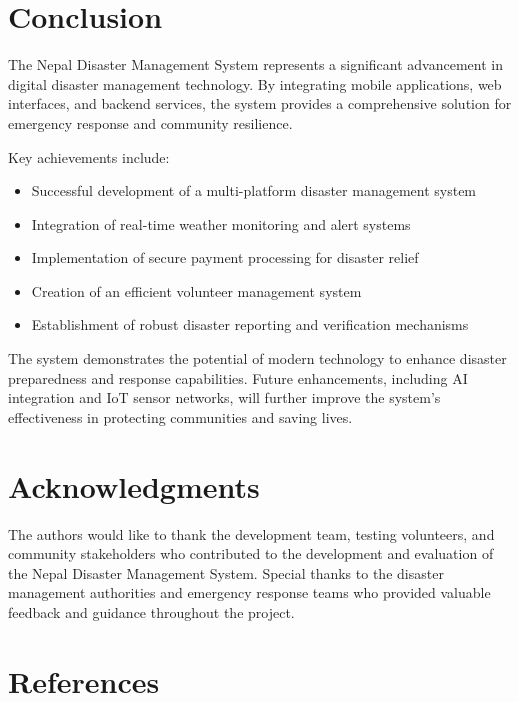 \documentclass[12pt,a4paper]{article}
\begin{document}
\section{Conclusion}

The Nepal Disaster Management System represents a significant advancement in digital disaster management technology. By integrating mobile applications, web interfaces, and backend services, the system provides a comprehensive solution for emergency response and community resilience.

Key achievements include:

\begin{itemize}
    \item Successful development of a multi-platform disaster management system
    \item Integration of real-time weather monitoring and alert systems
    \item Implementation of secure payment processing for disaster relief
    \item Creation of an efficient volunteer management system
    \item Establishment of robust disaster reporting and verification mechanisms
\end{itemize}

The system demonstrates the potential of modern technology to enhance disaster preparedness and response capabilities. Future enhancements, including AI integration and IoT sensor networks, will further improve the system's effectiveness in protecting communities and saving lives.

\section{Acknowledgments}

The authors would like to thank the development team, testing volunteers, and community stakeholders who contributed to the development and evaluation of the Nepal Disaster Management System. Special thanks to the disaster management authorities and emergency response teams who provided valuable feedback and guidance throughout the project.

\section{References}
\end{document}

